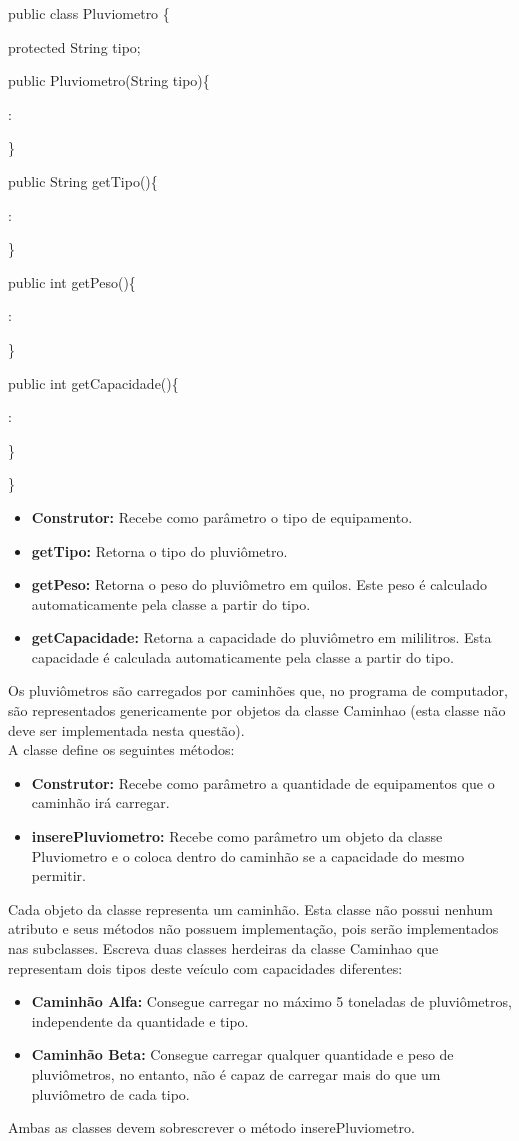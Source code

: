 \documentclass[12pt,a4paper, brazil]{article}
\begin{document}
public class Pluviometro \{
\par
 protected String tipo; \par
 
 public Pluviometro(String tipo)\{ \par
  : \par
 \}\par
 public String getTipo()\{ \par
 : \par
 \} \par
 public int getPeso()\{ \par
 : \par
 \} \par
 public int getCapacidade()\{ \par
 : \par
 \} \par
\} \par

\begin{itemize}
    \item \textbf{Construtor:} Recebe como parâmetro o tipo de equipamento.
    \item \textbf{getTipo:} Retorna o tipo do pluviômetro.
    \item \textbf{getPeso:} Retorna o peso do pluviômetro em quilos. Este peso é calculado automaticamente pela classe a partir do tipo.
    \item \textbf{getCapacidade:} Retorna a capacidade do pluviômetro em mililitros. Esta capacidade é calculada automaticamente pela classe a partir do tipo.
\end{itemize}
Os pluviômetros são carregados por caminhões que, no programa de computador, são representados genericamente por objetos da classe Caminhao (esta classe não deve ser implementada nesta questão). \\
A classe define os seguintes métodos:
\begin{itemize}
    \item \textbf{Construtor:} Recebe como parâmetro a quantidade de equipamentos que o caminhão irá carregar.
    \item \textbf{inserePluviometro:} Recebe como parâmetro um objeto da classe Pluviometro e o coloca dentro do caminhão se a capacidade do mesmo permitir.
\end{itemize}


Cada objeto da classe representa um caminhão. Esta classe não possui nenhum atributo e seus métodos não possuem implementação, pois serão implementados nas subclasses.
Escreva duas classes herdeiras da classe Caminhao que representam dois tipos deste veículo com capacidades diferentes:
\begin{itemize}
    \item \textbf{Caminhão Alfa: }Consegue carregar no máximo 5 toneladas de pluviômetros, independente da quantidade e tipo.
    \item \textbf{Caminhão Beta: } Consegue carregar qualquer quantidade e peso de pluviômetros, no entanto, não é capaz de carregar mais do que um pluviômetro de cada tipo.
\end{itemize}

Ambas as classes devem sobrescrever o método inserePluviometro.

\end{document}
